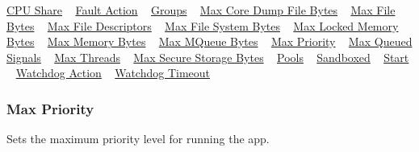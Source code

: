 \hyperlink{def_files_adef_defFilesAdef_cpuShare}{C\+P\+U Share} ~\newline
 \hyperlink{def_files_adef_defFilesAdef_processFaultAction}{Fault Action} ~\newline
 \hyperlink{def_files_adef_defFilesAdef_groups}{Groups} ~\newline
 \hyperlink{def_files_adef_defFilesAdef_processMaxCoreDumpFileBytes}{Max Core Dump File Bytes} ~\newline
 \hyperlink{def_files_adef_defFilesAdef_processMaxFileBytes}{Max File Bytes} ~\newline
 \hyperlink{def_files_adef_defFilesAdef_processMaxFileDescriptors}{Max File Descriptors} ~\newline
 \hyperlink{def_files_adef_defFilesAdef_maxFileSystemBytes}{Max File System Bytes} ~\newline
 \hyperlink{def_files_adef_defFilesAdef_processMaxLockedMemoryBytes}{Max Locked Memory Bytes} ~\newline
 \hyperlink{def_files_adef_defFilesAdef_maxMemoryBytes}{Max Memory Bytes} ~\newline
 \hyperlink{def_files_adef_defFilesAdef_maxMQueueBytes}{Max M\+Queue Bytes} ~\newline
 \hyperlink{def_files_sdef_defFilesSdef_maxPriority}{Max Priority} ~\newline
 \hyperlink{def_files_adef_defFilesAdef_maxQueuedSignals}{Max Queued Signals} ~\newline
 \hyperlink{def_files_adef_defFilesAdef_maxThreads}{Max Threads} ~\newline
 \hyperlink{def_files_adef_defFilesAdef_maxSecureStorageBytes}{Max Secure Storage Bytes} ~\newline
 \hyperlink{def_files_adef_defFilesAdef_pools}{Pools} ~\newline
 \hyperlink{def_files_adef_defFilesAdef_sandboxed}{Sandboxed} ~\newline
 \hyperlink{def_files_adef_defFilesAdef_start}{Start} ~\newline
 \hyperlink{def_files_adef_defFilesAdef_watchdogAction}{Watchdog Action} ~\newline
 \hyperlink{def_files_adef_defFilesAdef_watchdogTimeout}{Watchdog Timeout} ~\newline
\hypertarget{def_files_sdef_defFilesSdef_maxPriority}{}\subsubsection{Max Priority}\label{def_files_sdef_defFilesSdef_maxPriority}
Sets the maximum priority level for running the app.

